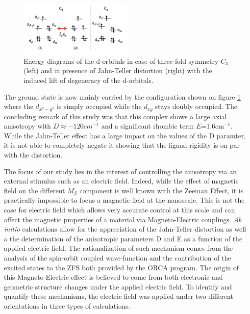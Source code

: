 \documentclass[10pt]{report}
\numberwithin{equation}{section}
\begin{document}
\begin{figure}
    \centering
    \includegraphics[width=0.5\textwidth]{Images/NiMe6tren_config.png}
    \caption{Energy diagrams of the d orbitals in case of three-fold symmetry $C_3$ (left) and in presence of Jahn-Teller distortion (right) with the induced lift of degeneracy of the d-orbitals. }
    \label{NiMe6tren_config}
\end{figure}

The ground state is now mainly carried by the configuration shown on figure \ref{NiMe6tren_config} where the $d_{x^2-y^2}$ is simply occupied while the $d_{xy}$ stays doubly occupied.
The concluding remark of this study was that this complex shows a large axial anisotropy with $D\approx-120cm^{-1}$ and a significant rhombic term $E$=1.6cm$^{-1}$. 
While the Jahn-Teller effect has a large impact on the values of the D paramter, it is not able to completely negate it showing that the ligand rigidity is on par with the distortion.

\par The focus of our study lies in the interest of controlling the anisotropy via an external stimulus such as an electric field.
Indeed, while the effect of magnetic field on the different $M_S$ component is well known with the Zeeman Effect, it is practically impossible to focus a magnetic field at the nanoscale.
This is not the case for electric field which allows very accurate control at this scale and can affect the magnetic properties of a material via Magneto-Electric couplings.
\textit{Ab} \textit{initio} calculations allow for the appreciation of the Jahn-Teller distortion as well a the determination of the anisotropic parameters D and E as a function of the applied electric field.
The rationalization of such mechanism comes from the analysis of the spin-orbit coupled wave-function and the contribution of the excited states to the ZFS both provided by the ORCA program.
The  origin of this Magneto-Electric effect is believed to come from both electronic and geometric structure changes under the applied electric field. 
To identify and quantify these mechanisms, the electric field was applied under two different orientations in three types of calculations:
\end{document}

